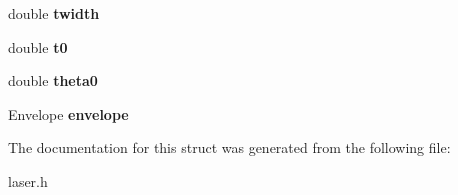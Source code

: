 \begin{DoxyCompactItemize}
double {\bfseries twidth}
\item 
\mbox{\label{struct_laser_param_a69922844f03c0e48524dbde1122f937c}} 
double {\bfseries t0}
\item 
\mbox{\label{struct_laser_param_a7077d91f31b40ddb59af2d29b78ef8c7}} 
double {\bfseries theta0}
\item 
\mbox{\label{struct_laser_param_a6ee3a695a5118caed6162e3643e4d8ad}} 
Envelope {\bfseries envelope}
\end{DoxyCompactItemize}


The documentation for this struct was generated from the following file\+:\begin{DoxyCompactItemize}
\item 
laser.\+h\end{DoxyCompactItemize}
